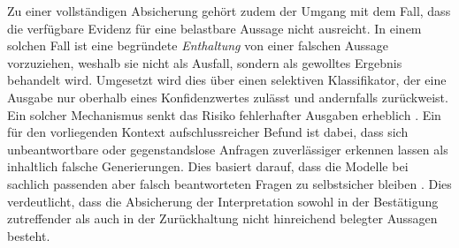 Zu einer vollständigen Absicherung gehört zudem der Umgang mit dem Fall, dass die verfügbare Evidenz für eine belastbare Aussage nicht ausreicht. In einem solchen Fall ist eine begründete \emph{Enthaltung} von einer falschen Aussage vorzuziehen, weshalb sie nicht als Ausfall, sondern als gewolltes Ergebnis behandelt wird. Umgesetzt wird dies über einen selektiven Klassifikator, der eine Ausgabe nur oberhalb eines Konfidenzwertes zulässt und andernfalls zurückweist. Ein solcher Mechanismus senkt das Risiko fehlerhafter Ausgaben erheblich \cite{somov_confidence_2025}. Ein für den vorliegenden Kontext aufschlussreicher Befund ist dabei, dass sich unbeantwortbare oder gegenstandslose Anfragen zuverlässiger erkennen lassen als inhaltlich falsche Generierungen. Dies basiert darauf, dass die Modelle bei sachlich passenden aber falsch beantworteten Fragen zu selbstsicher bleiben \cite{somov_confidence_2025}. Dies verdeutlicht, dass die Absicherung der Interpretation sowohl in der Bestätigung zutreffender als auch in der Zurückhaltung nicht hinreichend belegter Aussagen besteht.

